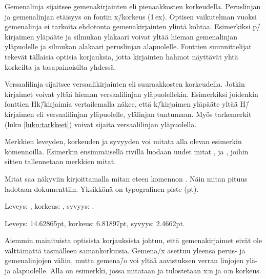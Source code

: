 Gemenalinja sijaitsee gemenakirjainten eli pienaakkosten korkeudella.
Peruslinjan ja gemenalinjan etäisyys on fontin x\=/korkeus (1\,ex).
Optisen vaikutelman vuoksi gemenalinja ei tarkoita ehdotonta
gemenakirjainten ylintä kohtaa. Esimerkiksi p\=/kirjaimen yläpääte ja
silmukan yläkaari voivat yltää hieman gemenalinjan yläpuolelle ja
silmukan alakaari peruslinjan alapuolelle. Fonttien suunnittelijat
tekevät tällaisia optisia korjauksia, jotta kirjainten hahmot näyttävät
yhtä korkeilta ja tasapainoisilta yhdessä.

Versaalilinja sijaitsee versaalikirjainten eli suuraakkosten
korkeudella. Jotkin kirjaimet voivat yltää hieman versaalilinjan
yläpuolellekin. Esimerkiksi joidenkin fonttien Hk\=/kirjaimia
vertailemalla näkee, että k\=/kirjaimen yläpääte yltää H\=/kirjaimen eli
versaalilinjan yläpuolelle, ylälinjan tuntumaan. Myös tarkemerkit (luku
\ref{luku:tarkkeet}) voivat sijaita versaalilinjan yläpuolella.

\pagebreak[3]

Merkkien leveyden, korkeuden ja syvyyden voi mitata alla olevan
esimerkin komennoilla. Esimerkin ensimmäisellä rivillä luodaan uudet
mitat ,  ja , joihin sitten tallennetaan merkkien mitat.

\begin{koodilohkosis}
  \newlength{\leveys} \newlength{\korkeus} \newlength{\syvyys}
  \settowidth{\leveys}{abc} %
\end{koodilohkosis}

\pagebreak[3]

Mitat saa näkyviin kirjoittamalla mitan eteen komennon . Näin mitan pituus ladotaan dokumenttiin. Yksikkönä on
typografinen piste (pt).

\begin{koodilohkosis}
  Leveys: \the\leveys, korkeus: \the\korkeus, syvyys: \the\syvyys.
\end{koodilohkosis}

\begin{tulossis}
  Leveys: 14.62865pt, korkeus: 6.81897pt, syvyys: 2.4662pt.
\end{tulossis}

Aiemmin mainituista optisista korjauksista johtuu, että gemenakirjaimet
eivät ole välttämättä täsmälleen samankorkuisia. Gemena\=/x asettuu
yleensä perus- ja gemenalinjojen väliin, mutta gemena\=/o voi yltää
aavistuksen verran linjojen ylä- ja alapuolelle. Alla on esimerkki,
jossa mitataan ja tulostetaan x:n ja o:n korkeus.

